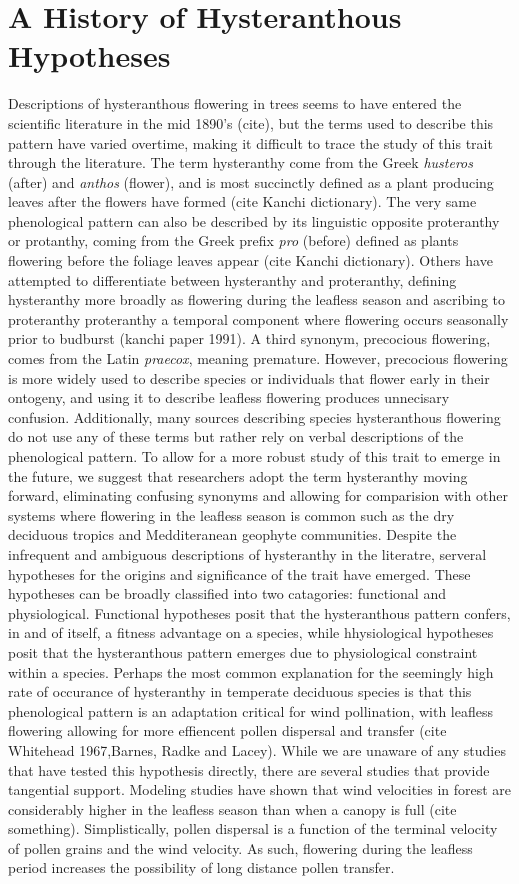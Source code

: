 \documentclass{article}\usepackage[]{graphicx}\usepackage[]{color}
\begin{document}
\section*{A History of Hysteranthous Hypotheses}
Descriptions of hysteranthous flowering in trees seems to have entered the scientific literature in the mid 1890's (cite), but the terms used to describe this pattern have varied overtime, making it difficult to trace the study of this trait through the literature. The term hysteranthy come from the Greek \textit{husteros} (after) and \textit{anthos} (flower), and is most succinctly defined as a plant producing leaves after the flowers have formed (cite Kanchi dictionary). The very same phenological pattern can also be described by its linguistic opposite proteranthy or protanthy, coming from the Greek prefix \textit{pro} (before) defined as plants flowering before the foliage leaves appear (cite Kanchi dictionary). Others have attempted to differentiate between hysteranthy and proteranthy, defining hysteranthy more broadly as flowering during the leafless season and ascribing to proteranthy proteranthy a temporal component where flowering occurs seasonally prior to budburst (kanchi paper 1991).  A third synonym, precocious flowering, comes from the Latin \textit{praecox}, meaning premature. However, precocious flowering is more widely used to describe species or individuals that flower early in their ontogeny, and using it to describe leafless flowering produces unnecisary confusion. Additionally, many sources describing species hysteranthous flowering do not use any of these terms but rather rely on verbal descriptions of the phenological pattern. To allow for a more robust study of this trait to emerge in the future, we suggest that researchers adopt the term hysteranthy moving forward, eliminating confusing synonyms and allowing for comparision with other systems where flowering in the leafless season is common such as the dry deciduous tropics and Medditeranean geophyte communities.
Despite the infrequent and ambiguous descriptions of hysteranthy in the literatre, serveral hypotheses for the origins and significance of the trait have emerged. These hypotheses can be broadly classified into two catagories: functional and physiological. Functional hypotheses posit that the hysteranthous pattern confers, in and of itself, a fitness advantage on a species, while hhysiological hypotheses posit that the hysteranthous pattern emerges due to physiological constraint within a species.
Perhaps the most common explanation for the seemingly high rate of occurance of hysteranthy in temperate deciduous species is that this phenological pattern is an adaptation critical for wind pollination, with leafless flowering allowing for more effiencent pollen dispersal and transfer (cite Whitehead 1967,Barnes, Radke and Lacey). While we are unaware of any studies that have tested this hypothesis directly, there are several studies that provide tangential support. Modeling studies have shown that wind velocities in forest are considerably higher in the leafless season than when a canopy is full (cite something). Simplistically, pollen dispersal is a function of the terminal velocity of pollen grains and the wind velocity. As such, flowering during the leafless period increases the possibility of long distance pollen transfer.
\end{document}
